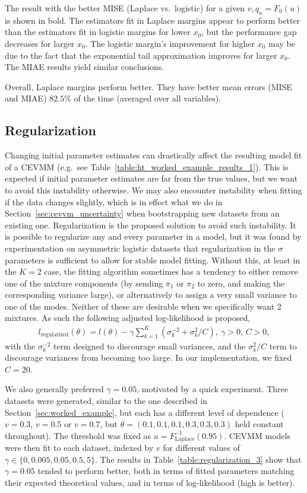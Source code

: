 \documentclass[11pt,twoside,openany]{book}
\numberwithin{Theorem}{chapter}
\numberwithin{Definition}{chapter}
\numberwithin{Lemma}{chapter}
\numberwithin{Algorithm}{chapter}
\numberwithin{equation}{chapter}
\begin{document}
The result with the better MISE (Laplace
vs.\ logistic) for a given $v,q_u = F_0(u)$ is shown in bold. The estimators fit
in Laplace margins appear to perform better than the estimators fit in logistic
margins for lower $x_0$, but the performance gap decreases for larger $x_0$.
The logistic margin's improvement for higher $x_0$ may be due to the fact that the
exponential tail approximation improves for larger $x_0$.
The MIAE results yield similar conclusions.

Overall, Laplace margins perform better. They have better mean errors (MISE and MIAE) $82.5\%$ of the time
(averaged over all variables).

\subsection{Regularization}\label{sec:regularization}

Changing initial parameter estimates can drastically affect the resulting model
fit of a CEVMM (e.g.\ see Table~\ref{table:ht_worked_example_results_1}).
This is expected if initial parameter estimates are far from the true values,
but we want to avoid this instability otherwise. We may also
encounter instability when fitting if the data changes slightly, which is
in effect what we do in Section~\ref{sec:cevvm_uncertainty} when bootstrapping
new datasets from an existing one. Regularization is the proposed solution
to avoid such instability.
It is possible to regularize any and every parameter in a model, but it was
found by experimentation on asymmetric logistic datasets that regularization in
the $\sigma$ parameters is sufficient to allow for stable model fitting.
Without this, at least in the $K=2$ case, the fitting
algorithm sometimes has a tendency to either remove one of the mixture components (by sending
$\pi_1$ or $\pi_2$ to zero, and making the corresponding variance large), or
alternatively to assign a very small variance to one of the modes. Neither of
these are desirable when we specifically want 2 mixtures. As such the following
adjusted log-likelihood is proposed,
\begin{align*}
  l_\text{regularized}(\theta) = l(\theta) - \gamma \sum_{k=1}^K (\sigma_k^{-2} + \sigma_k^2 / C),\ \gamma > 0,\, C > 0,
\end{align*}
with the $\sigma_k^{-2}$ term designed to discourage small variances, and the $\sigma_k^2/C$
term to discourage variances from becoming too large. In our implementation,
we fixed $C=20$.

We also generally preferred $\gamma=0.05$, motivated
by a quick experiment. Three datasets were
generated, similar to the one described in Section~\ref{sec:worked_example}, but each has a
different level of dependence ($v=0.3$, $v=0.5$ or $v=0.7$, but
$\theta=(0.1,0.1,0.1,0.3,0.3,0.3)$ held constant throughout).
The threshold was fixed as $u=F_{\text{Laplace}}^{-1}(0.95)$.
CEVMM models were then fit to each dataset, indexed by $v$
for different values of $\gamma\in\{0,0.005,0.05,0.5,5\}$. The results in Table~\ref{table:regularization_3}
show that $\gamma=0.05$ tended to perform better, both in terms of fitted parameters
matching their expected theoretical values, and in terms of log-likelihood (high is better).
\end{document}
